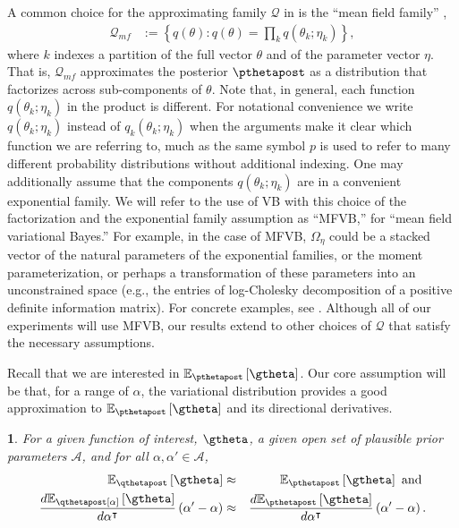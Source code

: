\documentclass{article}\usepackage[]{graphicx}\usepackage[]{color}
\theoremstyle{plain}
\theoremstyle{definition}
\theoremstyle{plain}
\theoremstyle{plain}
\newtheorem{assumption}[thm]{\protect\assumptionname}
\theoremstyle{plain}
\theoremstyle{plain}
\providecommand{\assumptionname}{Assumption}
\begin{document}
A common choice for the approximating family $\mathcal{Q}$ in 
is the ``mean field family'' \citep{wainwright2008graphical,blei:2016:variational},
\begin{align}
\mathcal{Q}_{mf} & :=\left\{ q\left(\theta\right):q\left(\theta\right)=\prod_{k}q\left(\theta_{k};\eta_{k}\right)\right\} ,\label{eq:q_mean_field_family}
\end{align}
where $k$ indexes a partition of the full vector $\theta$ and of
the parameter vector $\eta$. That is, $\mathcal{Q}_{mf}$ approximates
the posterior $\pthetapost$ as a distribution that factorizes across
sub-components of $\theta$. Note that, in general, each function
$q\left(\theta_{k};\eta_{k}\right)$ in the product is different.
For notational convenience we write $q\left(\theta_{k};\eta_{k}\right)$
instead of $q_{k}\left(\theta_{k};\eta_{k}\right)$ when the arguments
make it clear which function we are referring to, much as the same
symbol $p$ is used to refer to many different probability distributions
without additional indexing. One may additionally assume that the
components $q\left(\theta_{k};\eta_{k}\right)$ are in a convenient
exponential family. We will refer to the use of VB with this choice
of the factorization and the exponential family assumption as ``MFVB,''
for ``mean field variational Bayes.'' For example, in the case of
MFVB, $\Omega_{\eta}$ could be a stacked vector of the natural parameters
of the exponential families, or the moment parameterization, or perhaps
a transformation of these parameters into an unconstrained space (e.g.,
the entries of log-Cholesky decomposition of a positive definite information
matrix). For concrete examples, see .
Although all of our experiments will use MFVB, our results extend
to other choices of $\mathcal{Q}$ that satisfy the necessary assumptions. 

Recall that we are interested in $\epgtheta$. Our core assumption
will be that, for a range of $\alpha$, the variational distribution
provides a good approximation to $\epgtheta$ and its directional
derivatives.
\begin{assumption}
\label{assu:vb_accurate}For a given function of interest, $\gtheta$,
a given open set of plausible prior parameters $\mathcal{A}$, and
for all $\alpha,\alpha'\in\mathcal{A}$,
\begin{eqnarray*}
\mbe_{\qthetapost}\left[\gtheta\right] & \approx & \mbe_{\pthetapost}\left[\gtheta\right]\textrm{ and }\\
\frac{d\mbe_{\qthetapost[\alpha]}\left[\gtheta\right]}{d\alpha^{\trans}}\left(\alpha'-\alpha\right) & \approx & \frac{d\mbe_{\pthetapost}\left[\gtheta\right]}{d\alpha^{\trans}}\left(\alpha'-\alpha\right).
\end{eqnarray*}
%
\end{assumption}
\end{document}
